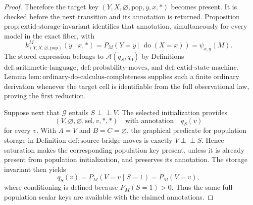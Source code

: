 \documentclass{article}
\begin{document}
\begin{proof}
Therefore the target key \((Y,X,\varnothing,\mathrm{pop},y,x,\ast)\) becomes present.  It is checked before the next transition and its annotation is returned.  Proposition \(\mathrm{prop{:}extid\text{-}storage\text{-}invariant}\) identifies that annotation, simultaneously for every model in the exact fiber, with
\[
k^M_{(Y,X,\varnothing,\mathrm{pop})}(y\mid x,\ast)
=P_M(Y=y\mid\operatorname{do}(X=x))
=\psi_{x,y}(M). \tag{3}
\]
The stored expression belongs to \(\mathcal A(q_S,q_0)\) by Definitions \(\mathrm{def{:}arithmetic\text{-}language}\), \(\mathrm{def{:}probability\text{-}moves}\), and \(\mathrm{def{:}extid\text{-}state\text{-}machine}\).  Lemma \(\mathrm{lem{:}ordinary\text{-}do\text{-}calculus\text{-}completeness}\) supplies such a finite ordinary derivation whenever the target cell is identifiable from the full observational law, proving the first reduction.

Suppose next that \(\mathcal G\) entails \(S\perp\!\!\!\perp V\).  The selected initialization provides
\[
(V,\varnothing,\varnothing,\mathrm{sel},v,\ast,\ast)
\quad\text{with annotation}\quad q_S(v)
\]
for every \(v\).  With \(A=V\) and \(B=C=\varnothing\), the graphical predicate for population storage in Definition \(\mathrm{def{:}source\text{-}bridge\text{-}moves}\) is exactly \(V\perp\!\!\!\perp S\).  Hence saturation makes the corresponding population key present, unless it is already present from population initialization, and preserves its annotation.  The storage invariant then yields
\[
q_S(v)=P_M(V=v\mid S=1)=P_M(V=v), \tag{4}
\]
where conditioning is defined because \(P_M(S=1)>0\).  Thus the same full-population scalar keys are available with the claimed annotations.


\end{proof}
\end{document}
